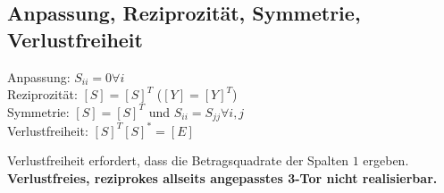 \documentclass[english]{latex4ei/latex4ei_sheet}
\begin{document}
\begin{sectionbox}
    \subsection{Anpassung, Reziprozität, Symmetrie, Verlustfreiheit}
    \begin{emphbox}
        Anpassung: $S_{ii} = 0 \forall i$\\
        Reziprozität: $[S] = [S]^T$ ($[Y] = [Y]^T$)\\
        Symmetrie: $[S] = [S]^T$ und $S_{ii} = S_{jj} \forall i,j$\\
        Verlustfreiheit: $[S]^T[S]^* = [E]$
    \end{emphbox}
    Verlustfreiheit erfordert, dass die Betragsquadrate der Spalten $1$ ergeben.\\
    \textbf{Verlustfreies, reziprokes allseits angepasstes 3-Tor nicht realisierbar.}
\end{sectionbox}
\end{document}
